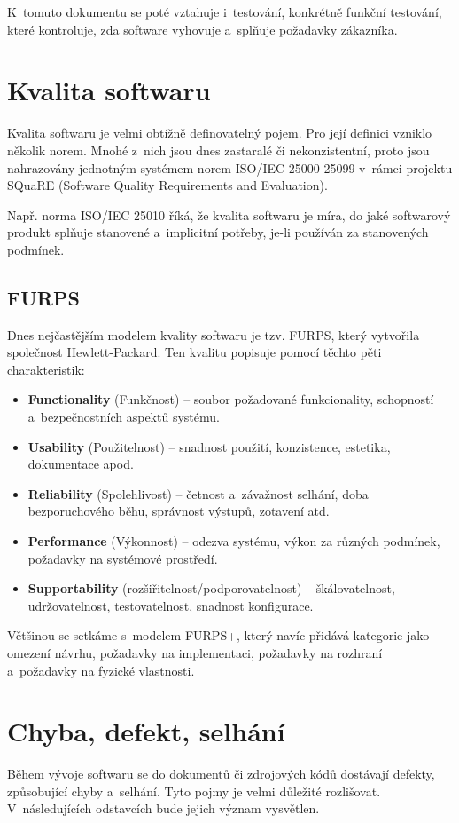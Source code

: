 	K~tomuto dokumentu se poté vztahuje i~testování, konkrétně funkční testování, které kontroluje, zda software vyhovuje a~splňuje požadavky zákazníka.
	
	\section{Kvalita softwaru}
	Kvalita softwaru je velmi obtížně definovatelný pojem. Pro její definici vzniklo několik norem. Mnohé z~nich jsou dnes zastaralé či nekonzistentní, proto jsou nahrazovány jednotným systémem norem ISO/IEC 25000-25099 v~rámci projektu SQuaRE (Software Quality Requirements and Evaluation).
	
	Např. norma ISO/IEC 25010 říká, že kvalita softwaru je míra, do jaké softwarový produkt splňuje stanovené a~implicitní potřeby, je-li používán za stanovených podmínek.
	
		\subsection{FURPS}
		Dnes nejčastějším modelem kvality softwaru je tzv. FURPS, který vytvořila společnost Hewlett-Packard. Ten kvalitu popisuje pomocí těchto pěti charakteristik:
			\begin{itemize}
				\item \textbf{Functionality} (Funkčnost) -- soubor požadované funkcionality, schopností a~bezpečnostních aspektů systému.
				\item \textbf{Usability} (Použitelnost) -- snadnost použití, konzistence, estetika, dokumentace apod.
				\item \textbf{Reliability} (Spolehlivost) -- četnost a~závažnost selhání, doba bezporuchového běhu, správnost výstupů, zotavení atd.
				\item \textbf{Performance} (Výkonnost) -- odezva systému, výkon za různých podmínek, požadavky na systémové prostředí.
				\item \textbf{Supportability} (rozšiřitelnost/podporovatelnost) -- škálovatelnost,\\udržovatelnost, testovatelnost, snadnost konfigurace.
			\end{itemize}
		Většinou se setkáme s~modelem FURPS+, který navíc přidává kategorie jako omezení návrhu, požadavky na implementaci, požadavky na rozhraní a~požadavky na fyzické vlastnosti.
			
	\section{Chyba, defekt, selhání}
	Během vývoje softwaru se do dokumentů či zdrojových kódů dostávají defekty, způsobující chyby a~selhání. Tyto pojmy je velmi důležité rozlišovat. V~následujících odstavcích bude jejich význam vysvětlen.
	

